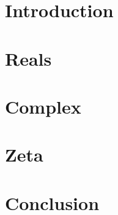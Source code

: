 \documentclass[11pt]{article}
\title{}%
\date{}
\author{Projet \coqtail{}}
\begin{document}
\maketitle

\section{Introduction}

\section{Reals}

	

\section{Complex}

	

\section{Zeta}

	

\section{Conclusion}


\printbibliography
\end{document}
